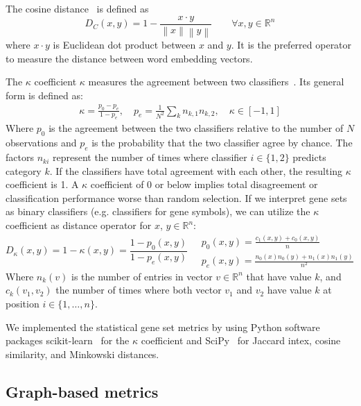 \documentclass{thesisclass}
\begin{document}
The cosine distance~\cite{Vijaymeena} is defined as
\begin{equation} \label{eq:cosine_dist}
	D_C(x,y)= 1- \frac{x \cdot y}{\left\| x \right\| \left\| y \right\|} \qquad \forall x, y \in \mathbb{R}^n
\end{equation}
where $x \cdot y$ is Euclidean dot product between $x$ and $y$. It is the preferred operator to measure the distance between word embedding vectors.

The $\kappa$ coefficient $\kappa$ measures the agreement between two classifiers~\cite{Artstein:2008:IAC:1479202.1479206}. Its general form is defined as:
\begin{align*} \label{eq:kappa}
	\kappa = \frac{p_0-p_e}{1-p_e}, \quad p_e = \frac{1}{N^2} \sum_{k} n_{k,1} n_{k,2}, \quad \kappa \in [-1, 1]
\end{align*}
Where $p_0$ is the agreement between the two classifiers relative to the number of $N$ observations and $p_e$ is the probability that the two classifier agree by chance. The factors $n_{ki}$ represent the number of times where classifier $i \in \lbrace 1,2 \rbrace$ predicts category $k$.
If the classifiers have total agreement with each other, the resulting $\kappa$ coefficient is 1.
A $\kappa$ coefficient of 0 or below implies total disagreement or classification performance worse than random selection.
If we interpret gene sets as binary classifiers (e.g. classifiers for gene symbols), we can utilize the $\kappa$ coefficient as distance operator for $x$, $y \in \mathbb{R}^n$:
\begin{equation} \label{eq:kappa_dist}
	D_\kappa(x, y)= 1-\kappa(x, y) = \frac{1-p_0(x,y)}{1-p_e(x,y)} \quad 
	\begin{array}{l}
		\displaystyle p_0(x,y) = \frac{c_1(x,y)+ c_0(x,y)}{n} \\
		\displaystyle p_e(x,y) = \frac{n_0(x)n_0(y)+ n_1(x)n_1(y)}{n^2}	
	\end{array}
\end{equation}
Where $n_k(v)$ is the number of entries in vector $v \in \mathbb{R}^n$ that have value $k$, and $c_k(v_1,v_2)$ the number of times where both vector $v_1$ and $v_2$ have value $k$ at position $i \in \lbrace 1, \ldots, n\rbrace$.

We implemented the statistical gene set metrics by using Python software packages scikit-learn~\cite{scikit-learn} for the $\kappa$ coefficient and SciPy~\cite{scipy} for Jaccard intex, cosine similarity, and Minkowski distances.

\subsection{Graph-based metrics}
\end{document}
